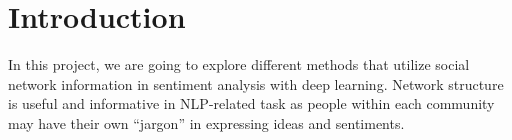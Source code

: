 
\section{Introduction}




In this project, we are going to explore different methods that utilize social network information in sentiment analysis with deep learning. Network structure is useful and informative in NLP-related task as people within each community may have their own ``jargon'' in expressing ideas and sentiments. 
